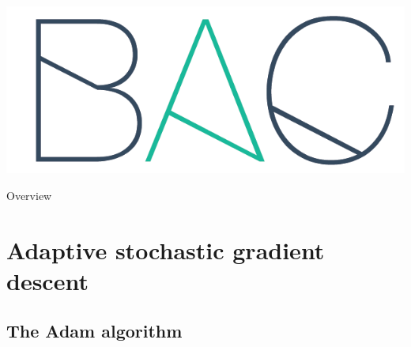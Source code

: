 \documentclass{beamer}
\title[\lecturetitle]{\lecturetitle}
\author[Derek Huang (BAC Advanced Team)]{Derek Huang}
\institute{BAC Advanced Team}
\date{February 13, 2021}
\numberwithin{equation}{section}
\begin{document}
\begin{frame}
    \titlepage
    \centering
    \includegraphics[scale = 0.1]{bac_logo1.png}
\end{frame}

\begin{frame}{Overview}
    \tableofcontents
\end{frame}

\section{Adaptive stochastic gradient descent}

\subsection{The Adam algorithm}
\end{document}
